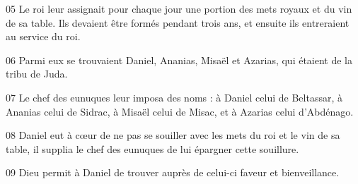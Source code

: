 
05 Le roi leur assignait pour chaque jour une portion des mets royaux et du vin de sa table. Ils devaient être formés pendant trois ans, et ensuite ils entreraient au service du roi.

06 Parmi eux se trouvaient Daniel, Ananias, Misaël et Azarias, qui étaient de la tribu de Juda.

07 Le chef des eunuques leur imposa des noms : à Daniel celui de Beltassar, à Ananias celui de Sidrac, à Misaël celui de Misac, et à Azarias celui d’Abdénago.

08 Daniel eut à cœur de ne pas se souiller avec les mets du roi et le vin de sa table, il supplia le chef des eunuques de lui épargner cette souillure.

09 Dieu permit à Daniel de trouver auprès de celui-ci faveur et bienveillance.
